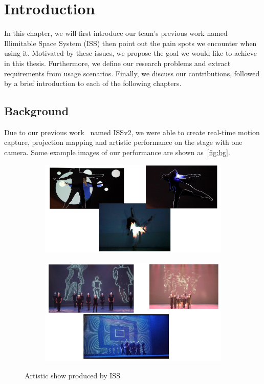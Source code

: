 \chapter{Introduction}
\label{chap:Introduction}


In this chapter, we will first introduce our team's previous work named 
Illimitable Space System (ISS) then point out the pain spots we encounter when 
using it.
Motivated by these issues, we propose the goal we would like to
achieve in this thesis.
Furthermore, we define our research problems and extract
requirements from usage scenarios.
Finally, we discuss our contributions, followed by a brief introduction
to each of the following chapters.

\section{Background}
\label{sec:intro-background}

Due to our previous work~\cite{iss-v2-design-theory-journal} named ISSv2, we
were able to create real-time motion capture, projection mapping and artistic
performance on the stage with one camera. Some example images of our
performance are shown as~\autoref{fig:bg}.

\begin{figure}[ht]
    \begin{subfigure}
        \centering
        \includegraphics[width=.8\linewidth]{figures/bg1.png}
        \label{fig:sub-first}
    \end{subfigure}
    \begin{subfigure}
        \centering
        \includegraphics[width=.8\linewidth]{figures/bg2.png}
        \label{fig:sub-second}
    \end{subfigure}
    \caption{Artistic show produced by ISS}
    \label{fig:bg}
\end{figure}

